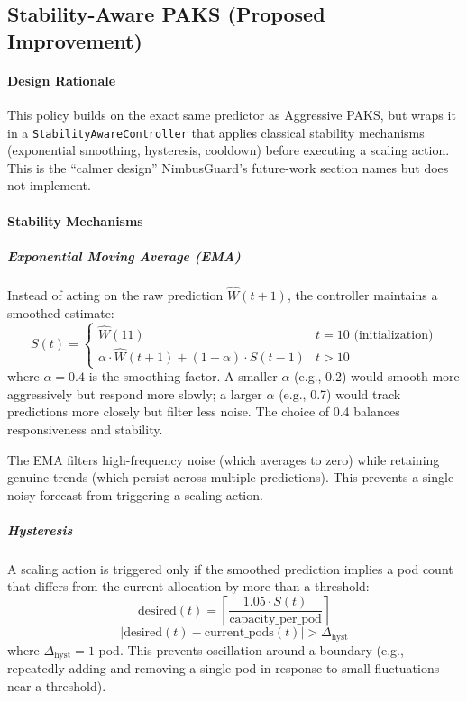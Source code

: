 \subsection{Stability-Aware PAKS (Proposed Improvement)}

\paragraph{Design Rationale} This policy builds on the exact same predictor as Aggressive PAKS, but wraps it in a \texttt{StabilityAwareController} that applies classical stability mechanisms (exponential smoothing, hysteresis, cooldown) before executing a scaling action. This is the ``calmer design'' NimbusGuard's future-work section names but does not implement.

\paragraph{Stability Mechanisms}

\subparagraph{Exponential Moving Average (EMA)} Instead of acting on the raw prediction $\hat{W}(t+1)$, the controller maintains a smoothed estimate:
\[
S(t) = \begin{cases}
\hat{W}(11) & t = 10 \text{ (initialization)} \\
\alpha \cdot \hat{W}(t+1) + (1 - \alpha) \cdot S(t-1) & t > 10
\end{cases}
\]
where $\alpha = 0.4$ is the smoothing factor. A smaller $\alpha$ (e.g., 0.2) would smooth more aggressively but respond more slowly; a larger $\alpha$ (e.g., 0.7) would track predictions more closely but filter less noise. The choice of 0.4 balances responsiveness and stability.

The EMA filters high-frequency noise (which averages to zero) while retaining genuine trends (which persist across multiple predictions). This prevents a single noisy forecast from triggering a scaling action.

\subparagraph{Hysteresis} A scaling action is triggered only if the smoothed prediction implies a pod count that differs from the current allocation by more than a threshold:
\[
\text{desired}(t) = \left\lceil \frac{1.05 \cdot S(t)}{\text{capacity\_per\_pod}} \right\rceil
\]
\[
|\text{desired}(t) - \text{current\_pods}(t)| > \Delta_{\text{hyst}}
\]
where $\Delta_{\text{hyst}} = 1$ pod. This prevents oscillation around a boundary (e.g., repeatedly adding and removing a single pod in response to small fluctuations near a threshold).

